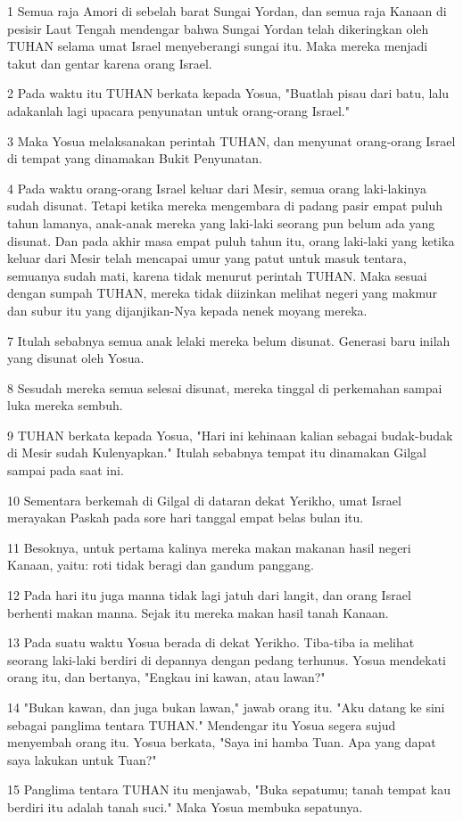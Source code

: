 \par 1 Semua raja Amori di sebelah barat Sungai Yordan, dan semua raja Kanaan di pesisir Laut Tengah mendengar bahwa Sungai Yordan telah dikeringkan oleh TUHAN selama umat Israel menyeberangi sungai itu. Maka mereka menjadi takut dan gentar karena orang Israel.
\par 2 Pada waktu itu TUHAN berkata kepada Yosua, "Buatlah pisau dari batu, lalu adakanlah lagi upacara penyunatan untuk orang-orang Israel."
\par 3 Maka Yosua melaksanakan perintah TUHAN, dan menyunat orang-orang Israel di tempat yang dinamakan Bukit Penyunatan.
\par 4 Pada waktu orang-orang Israel keluar dari Mesir, semua orang laki-lakinya sudah disunat. Tetapi ketika mereka mengembara di padang pasir empat puluh tahun lamanya, anak-anak mereka yang laki-laki seorang pun belum ada yang disunat. Dan pada akhir masa empat puluh tahun itu, orang laki-laki yang ketika keluar dari Mesir telah mencapai umur yang patut untuk masuk tentara, semuanya sudah mati, karena tidak menurut perintah TUHAN. Maka sesuai dengan sumpah TUHAN, mereka tidak diizinkan melihat negeri yang makmur dan subur itu yang dijanjikan-Nya kepada nenek moyang mereka.
\par 7 Itulah sebabnya semua anak lelaki mereka belum disunat. Generasi baru inilah yang disunat oleh Yosua.
\par 8 Sesudah mereka semua selesai disunat, mereka tinggal di perkemahan sampai luka mereka sembuh.
\par 9 TUHAN berkata kepada Yosua, "Hari ini kehinaan kalian sebagai budak-budak di Mesir sudah Kulenyapkan." Itulah sebabnya tempat itu dinamakan Gilgal sampai pada saat ini.
\par 10 Sementara berkemah di Gilgal di dataran dekat Yerikho, umat Israel merayakan Paskah pada sore hari tanggal empat belas bulan itu.
\par 11 Besoknya, untuk pertama kalinya mereka makan makanan hasil negeri Kanaan, yaitu: roti tidak beragi dan gandum panggang.
\par 12 Pada hari itu juga manna tidak lagi jatuh dari langit, dan orang Israel berhenti makan manna. Sejak itu mereka makan hasil tanah Kanaan.
\par 13 Pada suatu waktu Yosua berada di dekat Yerikho. Tiba-tiba ia melihat seorang laki-laki berdiri di depannya dengan pedang terhunus. Yosua mendekati orang itu, dan bertanya, "Engkau ini kawan, atau lawan?"
\par 14 "Bukan kawan, dan juga bukan lawan," jawab orang itu. "Aku datang ke sini sebagai panglima tentara TUHAN." Mendengar itu Yosua segera sujud menyembah orang itu. Yosua berkata, "Saya ini hamba Tuan. Apa yang dapat saya lakukan untuk Tuan?"
\par 15 Panglima tentara TUHAN itu menjawab, "Buka sepatumu; tanah tempat kau berdiri itu adalah tanah suci." Maka Yosua membuka sepatunya.

